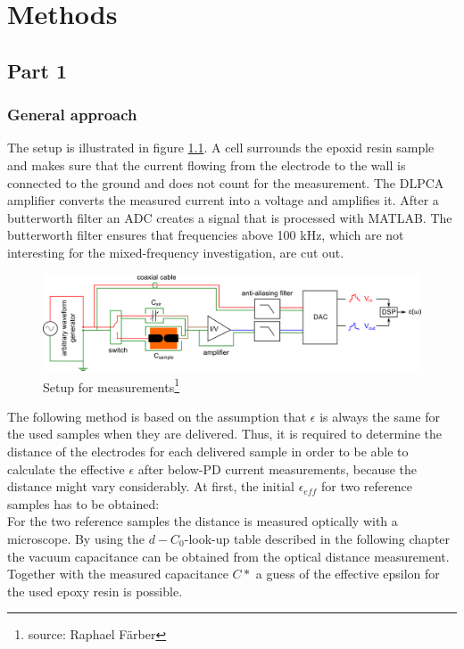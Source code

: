 \chapter{Methods}
\section{Part 1}
\subsection{General approach}
The setup is illustrated in figure \ref{sec.setup_amp_1}. A cell surrounds the  epoxid resin sample and makes sure that the current flowing from the electrode to the wall is connected to the ground and does not count for the measurement. The DLPCA amplifier converts the measured current into a voltage and amplifies it. After a butterworth filter an ADC creates a signal that is processed with MATLAB. The butterworth filter ensures that frequencies above 100 kHz, which are not interesting for the mixed-frequency investigation, are cut out. 

\begin{figure}[htbp]
	\centering
	\includegraphics[width=\textwidth]{figures/Method/setup/setup_amplifier.png}		
	\caption[Kurze Abbildungsbeschreibung]{Setup for measurements\footnote{source: Raphael F\"arber}} 
	\label{sec.setup_amp_1}

\end{figure}
\label{sec:general_approach}
The following method is based on the assumption that  $\epsilon$ is always the same for the used samples when they are delivered. Thus, it is required to determine the distance of the electrodes for each delivered sample in order to be able to calculate the effective $\epsilon$ after below-PD current measurements, because the distance might vary considerably. 
At first, the initial $\epsilon_{eff}$ for two reference samples has to be obtained:\\
For the two reference samples the distance is measured optically with a microscope. By using the $d-C_0$-look-up table described in the following chapter the vacuum capacitance can be obtained from the optical distance measurement. Together with the measured capacitance $C*$ a guess of the effective epsilon for the used epoxy resin is possible. 

